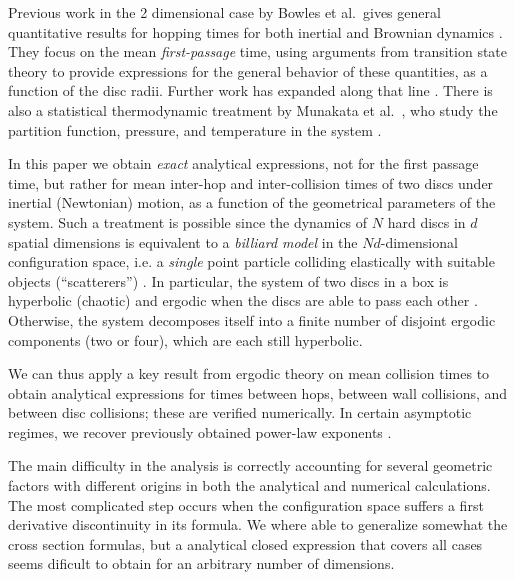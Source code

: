 \documentclass[superscriptaddress,pre,reprint,showpacs,twocolumn]{revtex4-1}
\newcommand{\etal}{et al.\ }
\begin{document}
 
Previous work in the 2 dimensional case
by Bowles \etal gives general quantitative results for hopping times 
for both inertial and Brownian dynamics \cite{Bowles04}. They focus
on the mean \emph{first-passage} time, using arguments from transition state theory 
to provide expressions for the general behavior of these quantities, as a function of the
disc radii. %
Further work has expanded along that line  \cite{Suh05, Ball09}.
There is also a statistical thermodynamic treatment by Munakata \etal, 
who study the partition function, pressure,
and temperature in the system \cite{Munakata02, Munakata06}. 


In this paper we obtain \emph{exact} analytical expressions, not for the first passage time,
but rather for mean inter-hop and inter-collision times of two discs under 
inertial (Newtonian) motion, as a function of the geometrical parameters of the system. Such a treatment is possible
 since the dynamics of $N$ hard discs in $d$ spatial dimensions
 is equivalent to a \emph{billiard model} in the $Nd$-dimensional configuration space, i.e. a \emph{single} point particle colliding elastically 
with suitable objects (``scatterers'') \cite{SzaszBook00}. 
In particular, the system of two discs in a box is hyperbolic (chaotic) and ergodic when the discs are able to pass each other \cite{Sim99}. Otherwise, the system decomposes itself into
a finite number of disjoint ergodic components (two or four), which are each still hyperbolic.

We can thus apply a key result from ergodic theory on mean collision times \cite{Chernov97} to obtain analytical expressions 
for times between hops, between wall collisions, and between disc collisions; these are verified numerically. 
In certain asymptotic regimes, we recover previously obtained power-law exponents \cite{Bowles04}.

The main difficulty in the analysis is correctly accounting for several geometric factors with different origins in both the
analytical and numerical calculations. The most complicated step occurs when the configuration space
suffers a first derivative discontinuity in its formula. We where able to generalize somewhat
the cross section formulas, but a analytical closed expression that covers all cases seems
dificult to obtain for an arbitrary number of dimensions. 


\end{document}
